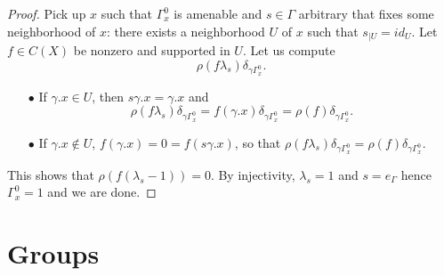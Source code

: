 \begin{proof}
Pick up $x$ such that $\Gamma^0_x$ is amenable and $s\in \Gamma$ arbitrary that fixes some neighborhood of $x$: there exists a neighborhood $U$ of $x$ such that $s_{|U}= id_{U}$. Let $f\in C(X)$ be nonzero and supported in $U$. Let us compute 
\[\rho(f\lambda_s)\delta_{\gamma\Gamma^0_x}.\]
\begin{itemize}
\item[$\bullet$] If $\gamma .x \in U$, then $s\gamma . x = \gamma . x$ and 
\[\rho(f\lambda_s)\delta_{\gamma\Gamma^0_x} = f(\gamma . x)\delta_{\gamma \Gamma^0_x} = \rho(f)\delta_{\gamma\Gamma^0_x}.\]  
\item[$\bullet$] If $\gamma .x \notin U$, $f(\gamma . x) = 0 = f( s \gamma . x)$, so that $\rho(f\lambda_s)\delta_{\gamma\Gamma^0_x} =\rho(f)\delta_{\gamma\Gamma^0_x}$.\\
\end{itemize}
This shows that $\rho(f (\lambda_s - 1)) = 0$. By injectivity, $\lambda_s = 1$ and $s=e_\Gamma$ hence $\Gamma^0_x=1$ and we are done.
\end{proof}

\newpage
\section{Groups}

